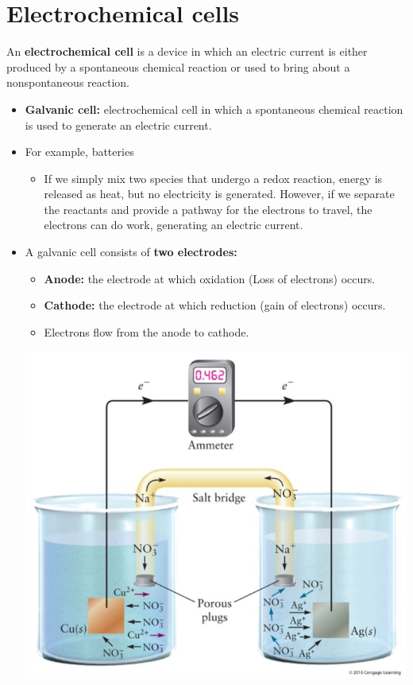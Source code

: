 \documentclass[10pt]{article}
\begin{document}
\pagebreak
\section*{Electrochemical cells}
An \textbf{electrochemical cell} is a device in which an electric current is either produced by a spontaneous chemical reaction or used to bring about a nonspontaneous reaction.
\begin{itemize}
    \item \textbf{Galvanic cell:} electrochemical cell in which a spontaneous chemical reaction is used to generate an electric current.
    \item For example, batteries
    \begin{itemize}
        \item If we simply mix two species that undergo a redox reaction, energy is released as heat, but no electricity is generated.  However, if we separate the reactants and provide a pathway for the electrons to travel, the electrons can do work, generating an electric current.
    \end{itemize}
    \item A galvanic cell consists of \textbf{two electrodes:}
    \begin{itemize}
        \item \textbf{Anode:} the electrode at which oxidation (Loss of electrons) occurs.
        \item \textbf{Cathode:} the electrode at which reduction (gain of electrons) occurs.
        \item Electrons flow from the anode to cathode.
    \end{itemize}
    \begin{center}
        \includegraphics*[scale=0.9]{W9_1.png}
    \end{center}
\end{itemize}
\end{document}
